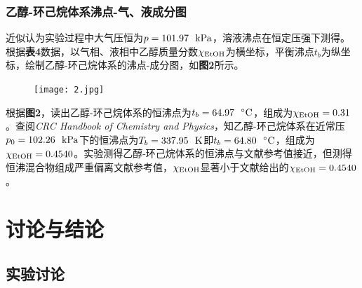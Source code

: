 \documentclass[12pt]{article}
\begin{document}
\subsubsection{乙醇-环己烷体系沸点-气、液成分图}
近似认为实验过程中大气压恒为$p=101.97\ \ {\rm kPa}$，溶液沸点在恒定压强下测得。根据\textbf{表4}数据，以气相、液相中乙醇质量分数$\chi_{\ce{EtOH}}$为横坐标，平衡沸点$t_{b}$为纵坐标，绘制乙醇-环己烷体系的沸点-成分图，如\textbf{图2}所示。
\begin{figure}[h]
	\centering
	\texttt{[image: 2.jpg]}
\end{figure}
\par
根据\textbf{图2}，读出乙醇-环己烷体系的恒沸点为$t_{b}=64.97\ \ {\rm ^{\circ}C}$，组成为$\chi_{\ce{EtOH}}=0.31$。查阅\textit{CRC Handbook of Chemistry and Physics}\citealp{crc}，知乙醇-环己烷体系在近常压$p_{0}=102.26\ \ {\rm kPa}$下的恒沸点为$T_{b}=337.95\ \ {\rm K}$即$t_{b}=64.80\ \ {\rm ^{\circ}C}$，组成为$\chi_{\ce{EtOH}}=0.4540$。实验测得乙醇-环己烷体系的恒沸点与文献参考值接近，但测得恒沸混合物组成严重偏离文献参考值，$\chi_{\ce{EtOH}}$显著小于文献给出的$\chi_{\ce{EtOH}}=0.4540$。

\vbox{}
 	 \section{讨论与结论}
		\subsection{实验讨论}
\end{document}

